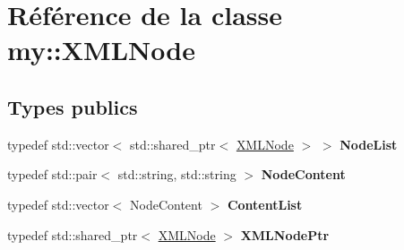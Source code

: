 \hypertarget{classmy_1_1XMLNode}{}\section{Référence de la classe my\+:\+:X\+M\+L\+Node}
\label{classmy_1_1XMLNode}
\subsection*{Types publics}
\begin{DoxyCompactItemize}
\item 
\mbox{\label{classmy_1_1XMLNode_a059f6c84130d9bd7e5ed1f65302f73ba}} 
typedef std\+::vector$<$ std\+::shared\+\_\+ptr$<$ \hyperlink{classmy_1_1XMLNode}{X\+M\+L\+Node} $>$ $>$ {\bfseries Node\+List}
\item 
\mbox{\label{classmy_1_1XMLNode_aad308969a5890ae606e814830b87de23}} 
typedef std\+::pair$<$ std\+::string, std\+::string $>$ {\bfseries Node\+Content}
\item 
\mbox{\label{classmy_1_1XMLNode_a3d2cd493b8c4c4c46d4d6778769582dd}} 
typedef std\+::vector$<$ Node\+Content $>$ {\bfseries Content\+List}
\item 
\mbox{\label{classmy_1_1XMLNode_a33b73f4f2aea8334b232aa429cf1f9b2}} 
typedef std\+::shared\+\_\+ptr$<$ \hyperlink{classmy_1_1XMLNode}{X\+M\+L\+Node} $>$ {\bfseries X\+M\+L\+Node\+Ptr}
\end{DoxyCompactItemize}
